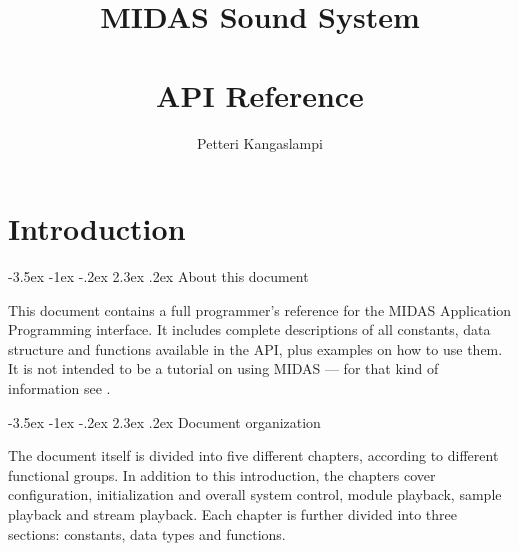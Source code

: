 \documentclass[a4paper,12pt,oneside]{book}
\author{Petteri Kangaslampi}
\title{MIDAS Sound System\\ \ \\ API Reference}
\makeatletter
\renewcommand\section{\@startsection {section}{1}{-20pt}%
                                   {-3.5ex \@plus -1ex \@minus -.2ex}%
                                   {2.3ex \@plus.2ex}%
                                   {\normalfont\Large\bfseries}}
\makeatother
\begin{document}
\maketitle
{}
\tableofcontents

\newpage
{}


\chapter{Introduction}



\section{About this document}

This document contains a full programmer's reference for the MIDAS
Application Programming interface. It includes complete descriptions of all
constants, data structure and functions available in the API, plus examples
on how to use them. It is not intended to be a tutorial on using MIDAS ---
for that kind of information see
.



\section{Document organization}

The document itself is divided into five different chapters, according to
different functional groups. In addition to this introduction, the chapters
cover configuration, initialization and overall system control, module
playback, sample playback and stream playback. Each chapter is further
divided into three sections: constants, data types and functions.




\end{document}
